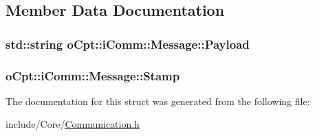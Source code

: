 \subsection{Member Data Documentation}
\subsubsection[{\texorpdfstring{Payload}{Payload}}]{\setlength{\rightskip}{0pt plus 5cm}std\+::string o\+Cpt\+::i\+Comm\+::\+Message\+::\+Payload}\hypertarget{structo_cpt_1_1i_comm_1_1_message_a46117baa6509fd31f7e8cb187cc3f8a9}{}\label{structo_cpt_1_1i_comm_1_1_message_a46117baa6509fd31f7e8cb187cc3f8a9}
\subsubsection[{\texorpdfstring{Stamp}{Stamp}}]{ o\+Cpt\+::i\+Comm\+::\+Message\+::\+Stamp}\hypertarget{structo_cpt_1_1i_comm_1_1_message_ad00181a6c0e5cc88b61f808c1638972f}{}\label{structo_cpt_1_1i_comm_1_1_message_ad00181a6c0e5cc88b61f808c1638972f}


The documentation for this struct was generated from the following file\+:\begin{DoxyCompactItemize}
\item 
include/\+Core/\hyperlink{_communication_8h}{Communication.\+h}\end{DoxyCompactItemize}
